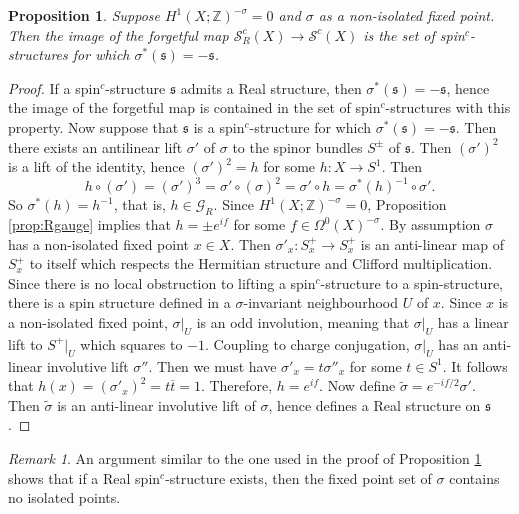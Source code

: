 \documentclass{amsart}
\newtheorem{proposition}[theorem]{Proposition}
\theoremstyle{definition}
\theoremstyle{remark}
\newtheorem{remark}[theorem]{Remark}
\numberwithin{equation}{section}
\begin{document}
\begin{proposition}\label{prop:realspinc}
Suppose $H^1(X ; \mathbb{Z})^{-\sigma} = 0$ and $\sigma$ as a non-isolated fixed point. Then the image of the forgetful map $\mathcal{S}^c_R(X) \to \mathcal{S}^c(X)$ is the set of spin$^c$-structures for which $\sigma^*(\mathfrak{s}) = -\mathfrak{s}$.
\end{proposition}
\begin{proof}
If a spin$^c$-structure $\mathfrak{s}$ admits a Real structure, then $\sigma^*(\mathfrak{s}) = -\mathfrak{s}$, hence the image of the forgetful map is contained in the set of spin$^c$-structures with this property. Now suppose that $\mathfrak{s}$ is a spin$^c$-structure for which $\sigma^*(\mathfrak{s}) = -\mathfrak{s}$. Then there exists an antilinear lift $\sigma'$ of $\sigma$ to the spinor bundles $S^\pm$ of $\mathfrak{s}$. Then $(\sigma')^2$ is a lift of the identity, hence $(\sigma')^2 = h$ for some $h : X \to S^1$. Then
\[
h \circ (\sigma') = (\sigma')^3 = \sigma' \circ (\sigma)^2 = \sigma' \circ h = \sigma^*(h)^{-1} \circ \sigma'.
\]
So $\sigma^*(h) = h^{-1}$, that is, $h \in \mathcal{G}_R$. Since $H^1(X ; \mathbb{Z})^{-\sigma} = 0$, Proposition \ref{prop:Rgauge} implies that $h = \pm e^{if}$ for some $f \in \Omega^0(X)^{-\sigma}$. By assumption $\sigma$ has a non-isolated fixed point $x \in X$. Then $\sigma'_x : S^+_x \to S^+_x$ is an anti-linear map of $S^+_x$ to itself which respects the Hermitian structure and Clifford multiplication. Since there is no local obstruction to lifting a spin$^c$-structure to a spin-structure, there is a spin structure defined in a $\sigma$-invariant neighbourhood $U$ of $x$. Since $x$ is a non-isolated fixed point, $\sigma|_U$ is an odd involution, meaning that $\sigma|_U$ has a linear lift to $S^+|_U$ which squares to $-1$. Coupling to charge conjugation, $\sigma|_U$ has an anti-linear involutive lift $\sigma''$. Then we must have $\sigma'_x = t \sigma''_x$ for some $t \in S^1$. It follows that $h(x) = (\sigma'_x)^2 = t \overline{t} = 1$. Therefore, $h = e^{if}$. Now define $\widetilde{\sigma} = e^{-if/2} \sigma'$. Then $\widetilde{\sigma}$ is an anti-linear involutive lift of $\sigma$, hence defines a Real structure on $\mathfrak{s}$.
\end{proof}

\begin{remark}
An argument similar to the one used in the proof of Proposition \ref{prop:realspinc} shows that if a Real spin$^c$-structure exists, then the fixed point set of $\sigma$ contains no isolated points.
\end{remark}
\end{document}
